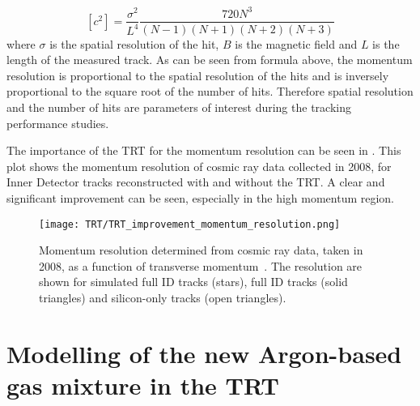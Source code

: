 \begin{equation}
[c^2] = \dfrac{\sigma^2}{L^4}\dfrac{720 N^3}{(N-1)(N+1)(N+2)(N+3)}
\end{equation}
where $\sigma$ is the spatial resolution of the hit, $B$ is the magnetic field and $L$ is the length of the measured track.
As can be seen from formula above, the momentum resolution is proportional to the spatial resolution of the hits and is inversely proportional to the square root of 
the number of hits. Therefore spatial resolution and the number of hits are parameters of interest during the tracking performance studies.

The importance of the TRT for the momentum resolution can be seen in .
This plot shows the momentum resolution of cosmic ray data collected in 2008, for Inner Detector tracks reconstructed with and without the TRT.
A clear and significant improvement can be seen, especially in the high momentum region.


\begin{figure}
\centering
\texttt{[image: TRT/TRT\_improvement\_momentum\_resolution.png]}
\caption{ 
Momentum resolution determined from cosmic ray data, taken in 2008, as a function of transverse momentum~\cite{Aad:2010bx}.
The resolution are shown for simulated full ID tracks (stars), full ID tracks (solid triangles) and silicon-only tracks (open triangles).
}
\label{fig:improvement_of_momentum_resolution}
\end{figure}



\section{Modelling of the new Argon-based gas mixture in the TRT}
\label{sec:digi_argon}

